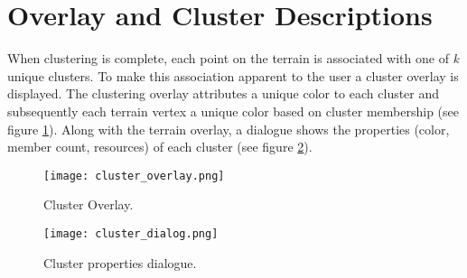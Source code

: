 \section{Overlay and Cluster Descriptions}

When clustering is complete, each point on the terrain is associated with one of \textit{k} unique clusters. To make this association apparent to the user a cluster overlay is displayed. The clustering overlay attributes a unique color to each cluster and subsequently each terrain vertex a unique color based on cluster membership (see figure \ref{fig:cluster_overlay}). Along with the terrain overlay, a dialogue shows the properties (color, member count, resources) of each cluster (see figure \ref{fig:cluster_dialog}).

\begin{figure}
\center
	\texttt{[image: cluster\_overlay.png]}
	\caption{ Cluster Overlay. }	
	\label{fig:cluster_overlay}
\end{figure}

\begin{figure}
\center
	\texttt{[image: cluster\_dialog.png]}
	\caption{ Cluster properties dialogue. }	
	\label{fig:cluster_dialog}
\end{figure}

